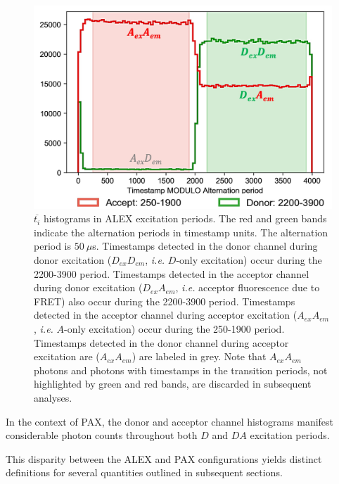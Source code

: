 \begin{figure}
    \centering
    \includegraphics[width=\textwidth]{chapters/figures/alternation_hist.jpg}
    \caption{\label{fig:alternation_hist} 
    $\overline{t_i}$ histograms in ALEX excitation periods.
    The red and green bands indicate the alternation periods in timestamp units.
    The alternation period is $50~\mu$s.
    Timestamps detected in the donor channel during donor excitation ($D_{ex}D_{em}$, \textit{i.e.} $D$-only excitation) occur during the 2200-3900 period.
    Timestamps detected in the acceptor channel during donor excitation ($D_{ex}A_{em}$, \textit{i.e.} acceptor fluorescence due to FRET) also occur during the 2200-3900 period.
    Timestamps detected in the acceptor channel during acceptor excitation ($A_{ex}A_{em}$, \textit{i.e.} $A$-only excitation) occur during the 250-1900 period.
    Timestamps detected in the donor channel during acceptor excitation are ($A_{ex}A_{em}$) are labeled in grey.
    Note that $A_{ex}A_{em}$ photons and photons with timestamps in the transition periods, not highlighted by green and red bands, are discarded in subsequent analyses.
    }
\end{figure}

In the context of \ac{PAX}, the donor and acceptor channel histograms manifest considerable photon counts throughout both $D$ and $DA$ excitation periods.

This disparity between the \ac{ALEX} and \ac{PAX} configurations yields distinct definitions for several quantities outlined in subsequent sections.

